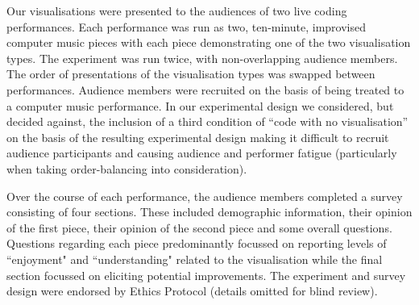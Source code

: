 \documentclass{sig-alternate}
\begin{document}



Our visualisations were presented to the audiences of two live coding performances. Each performance was run as two, ten-minute, improvised computer music pieces with each piece demonstrating one of the two visualisation types. The experiment was run twice, with non-overlapping audience members. The order of presentations of the visualisation types was swapped between performances. Audience members were recruited on the basis of being treated to a computer music performance. In our experimental design we considered, but decided against, the inclusion of a third condition of ``code with no visualisation'' on the basis of the resulting experimental design making it difficult to recruit audience participants and causing audience and performer fatigue (particularly when taking order-balancing into consideration). 

Over the course of each performance, the audience members completed a survey consisting of four sections. These included demographic information, their opinion of the first piece, their opinion of the second piece and some overall questions. Questions regarding each piece predominantly focussed on reporting levels of ``enjoyment" and ``understanding" related to the visualisation while the final section focussed on eliciting potential improvements. The experiment and survey design were endorsed by Ethics Protocol (details omitted for blind review).
\end{document}
